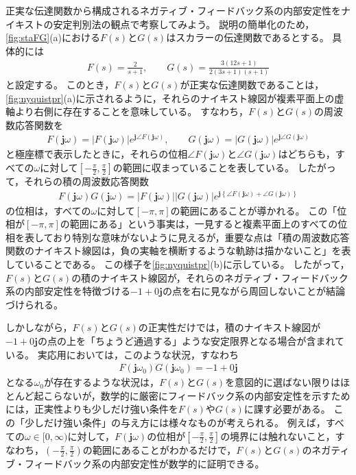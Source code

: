 \documentclass[tombow,dvipdfmx]{corona-a5}
\begin{document}
\begin{例}[ナイキストの安定判別法に基づく正実な伝達関数のフィードバック系の安定性解析]
\label{ex:nyquistpr}
正実な伝達関数から構成されるネガティブ・フィードバック系の内部安定性をナイキストの安定判別法の観点で考察してみよう。
説明の簡単化のため，\ref{fig:staFG}(a)における$F(s)$と$G(s)$はスカラーの伝達関数であるとする。
具体的には
\begin{align*}
F(s)=\frac{2}{s+1}
,\qquad
G(s)=\frac{3(12s+1)}{2(3s+1)(s+1)}
\end{align*}
と設定する。
このとき，$F(s)$と$G(s)$が正実な伝達関数であることは，\ref{fig:nyquistpr}(a)に示されるように，それらのナイキスト線図が複素平面上の虚軸より右側に存在することを意味している。
すなわち，$F(s)$と$G(s)$の周波数応答関数を
\begin{align*}
F(\bm{j} \omega) = |F(\bm{j} \omega)| e^{\bm{j} \angle F(\bm{j} \omega)}
,\qquad
G(\bm{j} \omega) = |G(\bm{j} \omega)| e^{\bm{j} \angle G(\bm{j} \omega)}
\end{align*}
と極座標で表示したときに，それらの位相$\angle F(\bm{j} \omega)$と$\angle G(\bm{j} \omega)$はどちらも，すべての$\omega$に対して$[-\frac{\pi}{2},\frac{\pi}{2}]$の範囲に収まっていることを表している。
したがって，それらの積の周波数応答関数
\begin{align*}
F(\bm{j} \omega) G(\bm{j} \omega)
=
|F(\bm{j} \omega)| |G(\bm{j} \omega)| e^{\bm{j} \left\{\angle F(\bm{j} \omega) + \angle G(\bm{j} \omega)\right\}}
\end{align*}
の位相は，すべての$\omega$に対して$[-\pi,\pi]$の範囲にあることが導かれる。
この「位相が$[-\pi,\pi]$の範囲にある」という事実は，一見すると複素平面上のすべての位相を表しており特別な意味がないように見えるが，重要な点は「積の周波数応答関数のナイキスト線図は，負の実軸を横断するような軌跡は描かないこと」を表していることである。
この様子を\ref{fig:nyquistpr}(b)に示している。
したがって，$F(s)$と$G(s)$の積のナイキスト線図が，それらのネガティブ・フィードバック系の内部安定性を特徴づける$-1 + 0 \bm{j}$の点を右に見ながら周回しないことが結論づけられる。

しかしながら，$F(s)$と$G(s)$の正実性だけでは，積のナイキスト線図が$-1 + 0 \bm{j}$の点の上を「ちょうど通過する」ような安定限界となる場合が含まれている。
実応用においては，このような状況，すなわち
\begin{align*}
F(\bm{j} \omega_0) G(\bm{j} \omega_0) = -1 + 0 \bm{j}
\end{align*}
となる$\omega_0$が存在するような状況は，$F(s)$と$G(s)$を意図的に選ばない限りはほとんど起こらないが，数学的に厳密にフィードバック系の内部安定性を示すためには，正実性よりも少しだけ強い条件を$F(s)$や$G(s)$に課す必要がある。
この「少しだけ強い条件」の与え方には様々なものが考えられる。
例えば，すべての$\omega \in [0,\infty)$に対して，$F(\bm{j} \omega)$の位相が$[-\frac{\pi}{2},\frac{\pi}{2}]$の境界には触れないこと，すなわち，$(-\frac{\pi}{2},\frac{\pi}{2})$の範囲にあることがわかるだけで，$F(s)$と$G(s)$のネガティブ・フィードバック系の内部安定性が数学的に証明できる。
\end{例}
\end{document}
